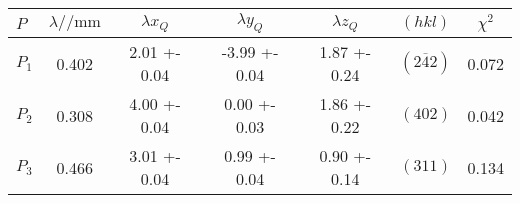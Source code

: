 \begin{tabular}{lSSSScS}
\toprule

{$P$} & {$\lambda /\si{\per\milli\metre}$} & {$\lambda x_Q$} & {$\lambda y_Q$} & {$\lambda z_Q$} & {$(hkl)$} & {$\chi^2$}\\

\midrule

$P_1$ & 0.402 & 2.01 +- 0.04 & -3.99 +- 0.04 & 1.87 +- 0.24 & $(2\overline{4}2)$ & 0.072\\
$P_2$ & 0.308 & 4.00 +- 0.04 & 0.00 +- 0.03 & 1.86 +- 0.22 & $(402)$ & 0.042\\
$P_3$ & 0.466 & 3.01 +- 0.04 & 0.99 +- 0.04 & 0.90 +- 0.14 & $(311)$ & 0.134\\

\bottomrule
\end{tabular}